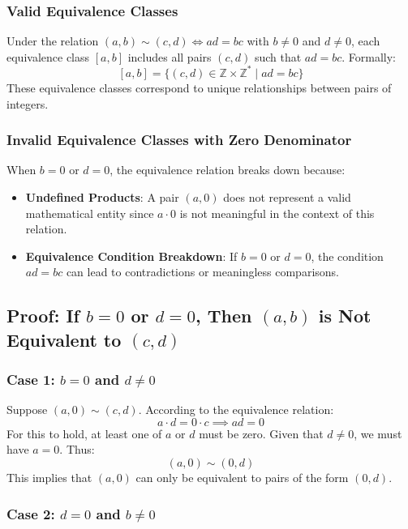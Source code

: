 \subsubsection*{Valid Equivalence Classes}

Under the relation \((a, b) \sim (c, d) \iff ad = bc\) with \( b \neq 0 \) and \( d \neq 0 \), each equivalence class \([a, b]\) includes all pairs \((c, d)\) such that \( ad = bc \). Formally:
\[
[a, b] = \{(c, d) \in \mathbb{Z} \times \mathbb{Z}^* \mid ad = bc\}
\]
These equivalence classes correspond to unique relationships between pairs of integers.

\subsubsection*{Invalid Equivalence Classes with Zero Denominator}

When \( b = 0 \) or \( d = 0 \), the equivalence relation breaks down because:

\begin{itemize}
	\item \textbf{Undefined Products}: A pair \((a, 0)\) does not represent a valid mathematical entity since \(a \cdot 0\) is not meaningful in the context of this relation.
	\item \textbf{Equivalence Condition Breakdown}: If \( b = 0 \) or \( d = 0 \), the condition \( ad = bc \) can lead to contradictions or meaningless comparisons.
\end{itemize}

\subsection*{Proof: If \( b = 0 \) or \( d = 0 \), Then \((a, b)\) is Not Equivalent to \((c, d)\)}

\subsubsection*{Case 1: \( b = 0 \) and \( d \neq 0 \)}

Suppose \((a, 0) \sim (c, d)\). According to the equivalence relation:
\[
a \cdot d = 0 \cdot c \implies ad = 0
\]
For this to hold, at least one of \(a\) or \(d\) must be zero. Given that \(d \neq 0\), we must have \(a = 0\). Thus:
\[
(a, 0) \sim (0, d)
\]
This implies that \((a, 0)\) can only be equivalent to pairs of the form \((0, d)\).

\subsubsection*{Case 2: \( d = 0 \) and \( b \neq 0 \)}

